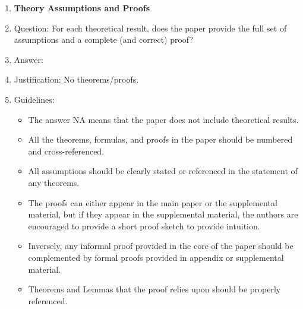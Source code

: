 \documentclass{article}
\begin{document}
\begin{enumerate}
\item {\bf Theory Assumptions and Proofs}
    \item[] Question: For each theoretical result, does the paper provide the full set of assumptions and a complete (and correct) proof?
    \item[] Answer: \answerNA{} %
    \item[] Justification: No theorems/proofs.
    \item[] Guidelines:
    \begin{itemize}
        \item The answer NA means that the paper does not include theoretical results. 
        \item All the theorems, formulas, and proofs in the paper should be numbered and cross-referenced.
        \item All assumptions should be clearly stated or referenced in the statement of any theorems.
        \item The proofs can either appear in the main paper or the supplemental material, but if they appear in the supplemental material, the authors are encouraged to provide a short proof sketch to provide intuition. 
        \item Inversely, any informal proof provided in the core of the paper should be complemented by formal proofs provided in appendix or supplemental material.
        \item Theorems and Lemmas that the proof relies upon should be properly referenced. 
    \end{itemize}


\end{enumerate}
\end{document}
